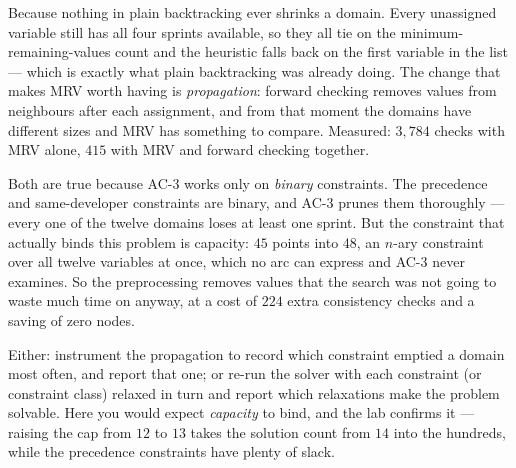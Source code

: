 \begin{ans}
  \item Because nothing in plain backtracking ever shrinks a domain. Every
        unassigned variable still has all four sprints available, so they all tie
        on the minimum-remaining-values count and the heuristic falls back on the
        first variable in the list --- which is exactly what plain backtracking was
        already doing. The change that makes MRV worth having is \emph{propagation}:
        forward checking removes values from neighbours after each assignment, and
        from that moment the domains have different sizes and MRV has something to
        compare. Measured: $3{,}784$ checks with MRV alone, $415$ with MRV and
        forward checking together.
  \item Both are true because AC-3 works only on \emph{binary} constraints. The
        precedence and same-developer constraints are binary, and AC-3 prunes them
        thoroughly --- every one of the twelve domains loses at least one sprint.
        But the constraint that actually binds this problem is capacity: $45$
        points into $48$, an $n$-ary constraint over all twelve variables at once,
        which no arc can express and AC-3 never examines. So the preprocessing
        removes values that the search was not going to waste much time on anyway,
        at a cost of $224$ extra consistency checks and a saving of zero nodes.
  \item Either: instrument the propagation to record which constraint emptied a
        domain most often, and report that one; or re-run the solver with each
        constraint (or constraint class) relaxed in turn and report which
        relaxations make the problem solvable. Here you would expect
        \emph{capacity} to bind, and the lab confirms it --- raising the cap from
        $12$ to $13$ takes the solution count from $14$ into the hundreds, while
        the precedence constraints have plenty of slack.
\end{ans}

